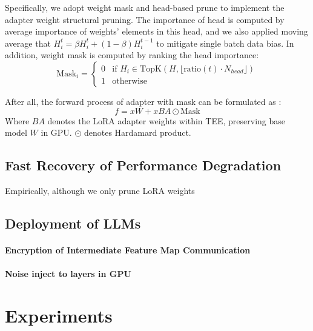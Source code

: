 \documentclass{article}
\begin{document}
Specifically, we adopt weight mask and head-based prune to implement the adapter weight structural pruning. The importance of head is computed by average importance of weights' elements in this head, and we also applied moving average that $H_i^t = \beta H_{i}^{t} + (1-\beta)H_i^{t-1}$ to mitigate single batch data bias.
In addition, weight mask is computed by ranking the head importance:
\begin{equation}
       \text{Mask}_i = \begin{cases} 
   0 & \text{if } H_i \in \text{TopK}(H, \lfloor \text{ratio}(t) \cdot N_{head} \rfloor) \\
   1 & \text{otherwise}
   \end{cases}
\end{equation}

After all, the forward process of adapter with mask can be formulated as :
\begin{equation}
    f = xW + xBA \odot \text{Mask}
\end{equation}
Where \( BA \) denotes the LoRA adapter weights within TEE, preserving base model \( W \) in GPU. $\odot$ denotes Hardamard product.

\subsection{Fast Recovery of Performance Degradation}
Empirically, although we only prune LoRA weights 


\subsection{Deployment of LLMs}

\paragraph{Encryption of Intermediate Feature Map Communication}
\paragraph{Noise inject to layers in GPU}

\section{Experiments}

\end{document}
